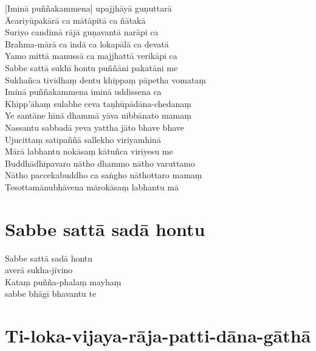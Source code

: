 
[Iminā puññakammena] upajjhāyā guṇuttarā\\
Ācariyūpakārā ca mātāpitā ca ñātakā\\
Suriyo candimā rājā guṇavantā narāpi ca\\
Brahma-mārā ca indā ca lokapālā ca devatā\\
Yamo mittā manussā ca majjhattā verikāpi ca\\
Sabbe sattā sukhī hontu puññāni pakatāni me\\
Sukhañca tividhaṃ dentu khippaṃ pāpetha vomataṃ\\
Iminā puññakammena iminā uddissena ca\\
Khipp'āhaṃ sulabhe ceva taṇhūpādāna-chedanaṃ\\
Ye santāne hīnā dhammā yāva nibbānato mamaṃ\\
Nassantu sabbadā yeva yattha jāto bhave bhave\\
Ujucittaṃ satipaññā sallekho viriyamhinā\\
Mārā labhantu nokāsaṃ kātuñca viriyesu me\\
Buddhādhipavaro nātho dhammo nātho varuttamo\\
Nātho paccekabuddho ca saṅgho nāthottaro mamaṃ\\
Tesottamānubhāvena mārokāsaṃ labhantu mā

\section{Sabbe sattā sadā hontu}


Sabbe sattā sadā hontu\\
\vin averā sukha-jīvino\\
Kataṃ puñña-phalaṃ mayhaṃ\\
\vin sabbe bhāgī bhavantu te

\section{Ti-loka-vijaya-rāja-patti-dāna-gāthā}


